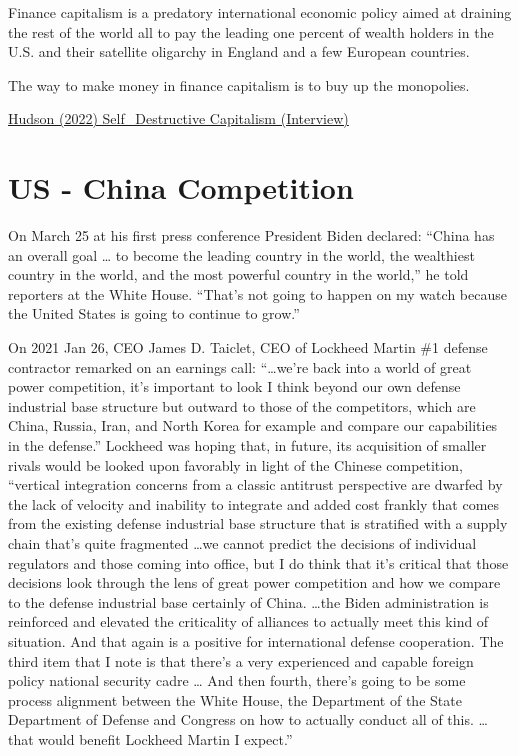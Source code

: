 \documentclass[
]{book}
\begin{document}
Finance capitalism is a predatory
international economic policy aimed at draining the rest of the world all
to pay the leading one percent of wealth holders in the U.S. and their
satellite oligarchy in England and a few European countries.

The way to make money in finance capitalism is to buy up the monopolies.

\href{http://thesaker.is/finance-capitalisms-self-destructive-nature/}{Hudson (2022) Self\_Destructive Capitalism (Interview)}

\hypertarget{us---china-competition}{%
\section{US - China Competition}\label{us---china-competition}}

On March 25 at his first press conference President Biden declared: ``China has an overall goal \ldots{} to become the leading country in the world, the wealthiest country in the world, and the most powerful country in the world,'' he told reporters at the White House. ``That's not going to happen on my watch because the United States is going to continue to grow.''

On 2021 Jan 26, CEO James D. Taiclet, CEO of Lockheed Martin \#1 defense contractor remarked on an earnings call:
``\ldots we're back into a world of great power competition, it's important to look I think beyond our own defense industrial base structure but outward to those of the competitors, which are China, Russia, Iran, and North Korea for example and compare our capabilities in the defense.'' Lockheed was hoping that, in future, its acquisition of smaller rivals would be looked upon favorably in light of the Chinese competition, ``vertical integration concerns from a classic antitrust perspective are dwarfed by the lack of velocity and inability to integrate and added cost frankly that comes from the existing defense industrial base structure that is stratified with a supply chain that's quite fragmented \ldots we cannot predict the decisions of individual regulators and those coming into office, but I do think that it's critical that those decisions look through the lens of great power competition and how we compare to the defense industrial base certainly of China. \ldots the Biden administration is reinforced and elevated the criticality of alliances to actually meet this kind of situation. And that again is a positive for international defense cooperation. The third item that I note is that there's a very experienced and capable foreign policy national security cadre \ldots{} And then fourth, there's going to be some process alignment between the White House, the Department of the State Department of Defense and Congress on how to actually conduct all of this. \ldots{} that would benefit Lockheed Martin I expect.''
\end{document}
